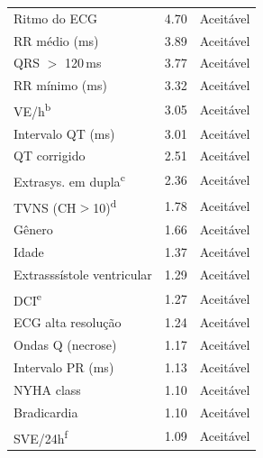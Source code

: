 \begin{table}[htbp]
{\begin{tabular}{lcc}
			\addlinespace
			Ritmo do ECG                          & 4.70  & Aceit\'avel                                      \\
			RR m\'edio (ms)                       & 3.89  & Aceit\'avel                                      \\
			QRS $>$ 120\,ms                       & 3.77  & Aceit\'avel                                      \\
			RR m\'inimo (ms)                      & 3.32  & Aceit\'avel                                      \\
			VE/h\textsuperscript{b}               & 3.05  & Aceit\'avel                                      \\
			Intervalo QT (ms)                     & 3.01  & Aceit\'avel                                      \\
			QT corrigido                          & 2.51  & Aceit\'avel                                      \\
			Extrasys. em dupla\textsuperscript{c} & 2.36  & Aceit\'avel                                      \\
			TVNS (CH$>$10)\textsuperscript{d}     & 1.78  & Aceit\'avel                                      \\
			G\^enero                              & 1.66  & Aceit\'avel                                      \\
			Idade                                 & 1.37  & Aceit\'avel                                      \\
			Extrasss\'istole ventricular          & 1.29  & Aceit\'avel                                      \\
			DCI\textsuperscript{e}                & 1.27  & Aceit\'avel                                      \\
			ECG alta resolu\c{c}\~ao              & 1.24  & Aceit\'avel                                      \\
			Ondas Q (necrose)                     & 1.17  & Aceit\'avel                                      \\
			Intervalo PR (ms)                     & 1.13  & Aceit\'avel                                      \\
			NYHA class                            & 1.10  & Aceit\'avel                                      \\
			Bradicardia                           & 1.10  & Aceit\'avel                                      \\
			SVE/24h\textsuperscript{f}            & 1.09  & Aceit\'avel                                      \\

\end{tabular}}
\end{table}
